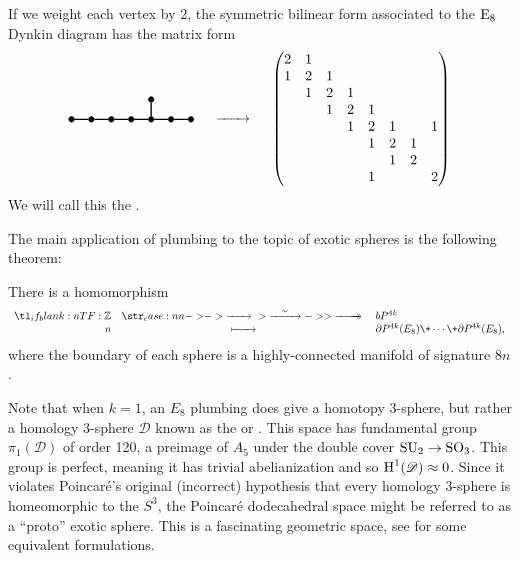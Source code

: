 \begin{example}
	If we weight each vertex by $2$, the symmetric bilinear form associated to the $\mathrm{E}_8$ Dynkin diagram has the matrix form
	\[
		\begin{tikzpicture}
			\tikzset{dynode/.style={circle, draw, fill=black,
						minimum size=4pt, inner sep=0pt}}
			\tikzset{dyline/.style={line width=1pt}}
			\tikzset{dydash/.style={line width=1pt, dashed}}

			\begin{scope}[yshift=-10em, xshift=0]
				\node[dynode] (a1) at (0,0) {};
				\node[dynode] (a2) at (0.5,0) {};
				\node[dynode] (a3) at (1,0) {};
				\node[dynode] (a4) at (1.5,0) {};
				\node[dynode] (a5) at (2,0) {};
				\node[dynode] (a6) at (2.5,0) {};
				\node[dynode] (a7) at (3,0) {};
				\node[dynode] (a8) at (2,0.5) {};

				\draw[dyline] (a1) -- (a2) -- (a3) -- (a4) -- (a5) -- (a6) -- (a7);
				\draw[dyline] (a5) -- (a8);
			\end{scope}
		\end{tikzpicture}
		\quad\lkxto\quad
		\begin{pmatrix}
			2 & 1 &   &   &   &   &   &   \\
			1 & 2 & 1 &   &   &   &   &   \\
			  & 1 & 2 & 1 &   &   &   &   \\
			  &   & 1 & 2 & 1 &   &   &   \\
			  &   &   & 1 & 2 & 1 &  & 1 \\
			  &   &   &   & 1 & 2 & 1 &  \\
			  &   &   &   &  & 1 & 2 &  \\
			  &   &   &   & 1 &  &  & 2 \\
		\end{pmatrix}
	\]
	We will call this the .
\end{example}

The main application of plumbing to the topic of exotic spheres is the following theorem:

\begin{theorem}
	There is a homomorphism
	\[
		\lkxfunc{}{\Z}{\bP^{4k}}{n}{\partial P^{4k}(E_8)\+\cdots\+\partial P^{4k}(E_8),}
	\]
	where the boundary of each sphere is a highly-connected manifold of signature $8n$.
\end{theorem}

\begin{remark}
	Note that when $k=1$, an $E_8$ plumbing does give a homotopy $3$-sphere, but rather a homology $3$-sphere $\mathscr{D}$ known as the  or . This space has fundamental group $\pi_1(\mathscr{D})$ of order 120, a preimage of $A_5$ under the double cover $\mathrm{SU}_2 \to \mathrm{SO}_3$. This group is perfect, meaning it has trivial abelianization and so $\operatorname{H}^1(\mathscr{D})\approx 0$. Since it violates Poincar\'e's original (incorrect) hypothesis that every homology $3$-sphere is homeomorphic to the $S^3$, the Poincar\'e dodecahedral space might be referred to as a ``proto'' exotic sphere. This is a fascinating geometric space, see \cite{kirby1979eight} for some equivalent formulations.
\end{remark}
